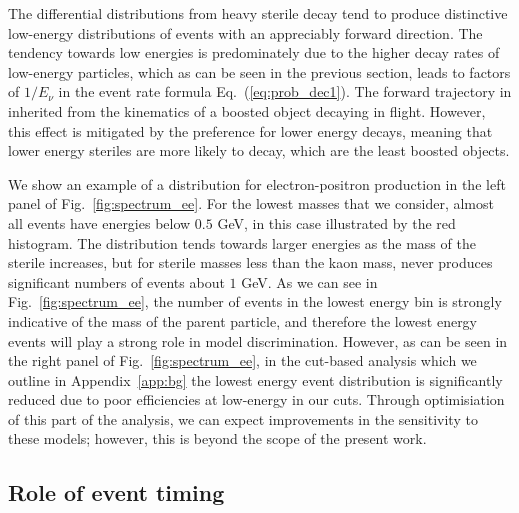 \documentclass[11pt, a4paper]{article}
\newcommand{\refeq}[1]{Eq.~(\ref{#1})}
\newcommand{\reffig}[1]{Fig.~\ref{#1}}
\newcommand{\refapp}[1]{Appendix~\ref{#1}}
\begin{document}
The differential distributions from heavy sterile decay tend to produce
distinctive low-energy distributions of events with an appreciably forward
direction. 
%
The tendency towards low energies is predominately due to the higher decay
rates of low-energy particles, which as can be seen in the previous section,
leads to factors of $1/E_\nu$ in the event rate formula \refeq{eq:prob_dec1}.
%
The forward trajectory in inherited from the kinematics of a boosted object
decaying in flight. However, this effect is mitigated by the preference for
lower energy decays, meaning that lower energy steriles are more likely to
decay, which are the least boosted objects.

We show an example of a distribution for electron-positron production in the
left panel of \reffig{fig:spectrum_ee}. For the lowest masses that we consider,
almost all events have energies below $0.5$ GeV, in this case illustrated by
the red histogram. The distribution tends towards larger energies as the mass
of the sterile increases, but for sterile masses less than the kaon mass, never
produces significant numbers of events about $1$ GeV. As we can see in
\reffig{fig:spectrum_ee}, the number of events in the lowest energy bin is
strongly indicative of the mass of the parent particle, and therefore the
lowest energy events will play a strong role in model discrimination. However,
as can be seen in the right panel of \reffig{fig:spectrum_ee}, in the cut-based
analysis which we outline in \refapp{app:bg} the lowest energy event
distribution is significantly reduced due to poor efficiencies at low-energy in
our cuts. Through optimisiation of this part of the analysis, we can expect
improvements in the sensitivity to these models; however, this is beyond the
scope of the present work. 



%
%
%

\subsection{\label{sec:timing}Role of event timing}
\end{document}
